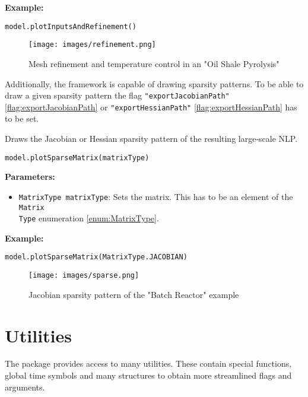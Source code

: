 \documentclass[12pt]{article}
\begin{document}
\begin{mdframed}[backgroundcolor=gray!10, roundcorner=10pt,
		linewidth=1pt]
	\textbf{Example:}
	\begin{lstlisting}
model.plotInputsAndRefinement()
\end{lstlisting}
	\begin{figure}[H]
		\centering
		\texttt{[image: images/refinement.png]}
		\caption{Mesh refinement and temperature control in an "Oil Shale
			Pyrolysis"}
		\label{fig:osp}
	\end{figure}
\end{mdframed}

Additionally, the framework is capable of drawing sparsity patterns. To be able
to draw a given sparsity pattern the flag \texttt{"exportJacobianPath"}
\eqref{flag:exportJacobianPath} or \texttt{"exportHessianPath"}
\eqref{flag:exportHessianPath} has to be set.

\begin{mdframed}[backgroundcolor=gray!10, roundcorner=10pt,
		linewidth=1pt]

	Draws the Jacobian or Hessian sparsity pattern of the resulting
	large-scale NLP.

	\begin{lstlisting}
model.plotSparseMatrix(matrixType)
		\end{lstlisting}
	\label{plotSparseMatrix}
	\textbf{Parameters:}
	\begin{itemize}
		\item \texttt{MatrixType matrixType}: Sets the matrix. This has
		      to be an element of the \texttt{Matrix\\Type} enumeration
		      \eqref{enum:MatrixType}.
	\end{itemize}

	\textbf{Example:}
	\begin{lstlisting}
model.plotSparseMatrix(MatrixType.JACOBIAN)   
\end{lstlisting}
	\begin{figure}[H]
		\centering
		\texttt{[image: images/sparse.png]}
		\caption{Jacobian sparsity pattern of the "Batch Reactor" example}
		\label{fig:sparseBatch}
	\end{figure}
\end{mdframed}

\section{Utilities}
The package provides access to many utilities.
These contain special functions, global time symbols and many structures to
obtain more streamlined flags and arguments.
\end{document}
